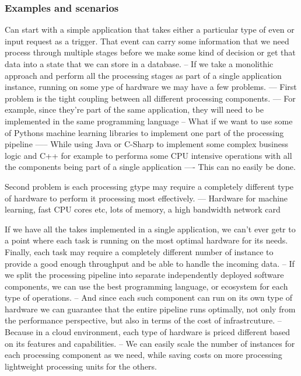 \documentclass[a4paper, 11pt]{book}
\begin{document}
    \subsubsection{Examples and scenarios}
    Can start with a simple application that takes either a particular type of even or input request as a trigger.
    That event can carry some information that we need process through multiple stages before we make some kind of decision or get that data into a state that we can store in a database.
    -- If we take a monolithic approach and perform all the processing stages as part of a single application instance, running on some ype of hardware we may have a few problems.
    --- First problem is the tight coupling between all different processing components.
    --- For example, since they're part of the same application, they will need to be implemented in the same programming language
    -- What if we want to use some of Pythons machine learning libraries to implement one part of the processing pipeline
    ----- While using Java or C-Sharp to implement some complex business logic and C++ for example to performa some CPU intensive operations with all the components being part of a single application
    ---- This can no easily be done.

    Second problem is each processing gtype may require a completely different type of hardware to perform it processing most effectively.
    --- Hardware for machine learning, fast CPU cores etc, lots of memory, a high bandwidth network card

    If we have all the takes implemented in a single application, we can't ever getr to a point where each task is running on the most optimal hardware for its needs.
    Finally, each task may require a completely different number of instance to provide a good enough throughput and be able to handle the incoming data.
    -- If we split the processing pipeline into separate independently deployed software components, we can use the best programming language, or ecosystem for each type of operations.
    -- And since each such component can run on its own type of hardware we can guarantee that the entire pipeline runs optimally, not only from the performance perspective, but also in terms of the cost of infrastrcuture.
    -- Because in a cloud environment, each type of hardware is priced different based on its features and capabilities.
    -- We can easily scale the number of instances for each processing component as we need, while saving costs on more processing lightweight processing units for the others.
\end{document}
